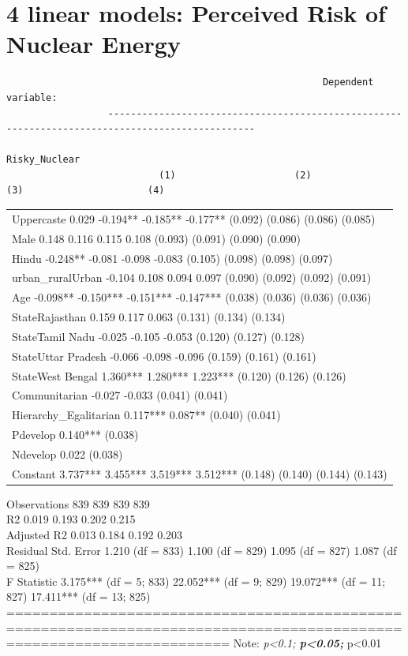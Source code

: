 \documentclass[
]{article}
\begin{document}
\newpage

\hypertarget{linear-models-perceived-risk-of-nuclear-energy}{%
\section{4 linear models: Perceived Risk of Nuclear
Energy}\label{linear-models-perceived-risk-of-nuclear-energy}}

\begin{verbatim}
                                                        Dependent variable:                                       
                  ------------------------------------------------------------------------------------------------
                                                           Risky_Nuclear                                          
                           (1)                     (2)                     (3)                      (4)           
\end{verbatim}

\begin{longtable}[]{@{}
  >{\raggedright\arraybackslash}p{}@{}}
\toprule
\endhead
Uppercaste 0.029 -0.194** -0.185** -0.177** (0.092) (0.086) (0.086)
(0.085) \\
Male 0.148 0.116 0.115 0.108 (0.093) (0.091) (0.090) (0.090) \\
Hindu -0.248** -0.081 -0.098 -0.083 (0.105) (0.098) (0.098) (0.097) \\
urban\_ruralUrban -0.104 0.108 0.094 0.097 (0.090) (0.092) (0.092)
(0.091) \\
Age -0.098** -0.150*** -0.151*** -0.147*** (0.038) (0.036) (0.036)
(0.036) \\
StateRajasthan 0.159 0.117 0.063 (0.131) (0.134) (0.134) \\
StateTamil Nadu -0.025 -0.105 -0.053 (0.120) (0.127) (0.128) \\
StateUttar Pradesh -0.066 -0.098 -0.096 (0.159) (0.161) (0.161) \\
StateWest Bengal 1.360*** 1.280*** 1.223*** (0.120) (0.126) (0.126) \\
Communitarian -0.027 -0.033 (0.041) (0.041) \\
Hierarchy\_Egalitarian 0.117*** 0.087** (0.040) (0.041) \\
Pdevelop 0.140*** (0.038) \\
Ndevelop 0.022 (0.038) \\
Constant 3.737*** 3.455*** 3.519*** 3.512*** (0.148) (0.140) (0.144)
(0.143) \\
\bottomrule
\end{longtable}

Observations 839 839 839 839\\
R2 0.019 0.193 0.202 0.215\\
Adjusted R2 0.013 0.184 0.192 0.203\\
Residual Std. Error 1.210 (df = 833) 1.100 (df = 829) 1.095 (df = 827)
1.087 (df = 825)\\
F Statistic 3.175*** (df = 5; 833) 22.052*** (df = 9; 829) 19.072*** (df
= 11; 827) 17.411*** (df = 13; 825)
======================================================================================================================
Note: \emph{p\textless0.1; \textbf{p\textless0.05; }}p\textless0.01
\end{document}
